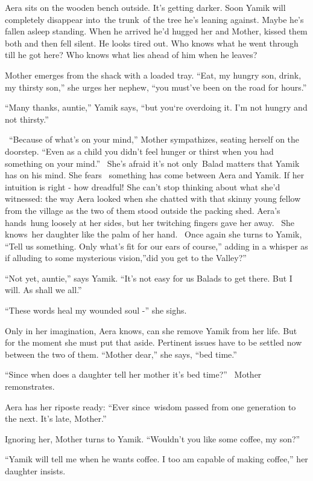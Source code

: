 \documentclass[twoside,11pt]{book}
\begin{document}
{Aera sits on the wooden bench
out}side{. }It's getting darker.
Soon{ Yamik will completely disappear into~the trunk~of the tree he's
leaning against. Maybe he's fallen asleep standing. When he }arrived he'd hugged her and Mother, kissed them both and
then fell silent. He looks tired out. Who knows what he went through till he got here? Who knows what lies ahead of him
when he leaves?

Mother emerges from the shack with a loaded tray. {{}``Eat, my hungry
son, drink, my thirsty son,'' she urges her
}{nephew}{, ``you must've been on the road for
hours.''}

{{}``Many thanks, auntie,'' Yamik says, ``but
you`re overdoing it. I'm not hungry }and not {thirsty.''}

\ {}``Because of what's on your mind,'' Mother sympathizes, seating herself on the doorstep. ``Even as a child you
didn't feel hunger or thirst when you had something on your mind.''~ She's afraid it's not only~Balad matters that
Yamik has on his mind. She fears \ something has come between Aera and Yamik. If her intuition is right - how dreadful!
She can't stop thinking about what she'd witnessed: the way Aera looked when she chatted with that
skinny{ }young fellow from the village as the two of them stood outside the packing shed. Aera's
hands~hung loosely at her sides, but her twitching fingers gave her away.~ She knows~her daughter like the palm of her
hand.~ Once again she turns to Yamik, ``Tell us something. Only what's fit for our ears of course,'' adding in a
whisper as if alluding to some mysterious vision,''did{ }you get to the Valley?''

{}``Not yet, auntie,'' says Yamik. ``It's not easy for us Balads to get there. But I will. As shall we all.''

{}``These words heal my wounded soul -'' she sighs.

Only in her imagination, Aera knows, can she remove Yamik from her life. But for the moment she must put that aside.
Pertinent issues have to be settled now between the two of them. ``Mother dear,'' she says, ``bed time.''~

{}``Since when does a daughter tell her mother it's bed time?'' \ Mother remonstrates.

Aera has her riposte ready: ``Ever since~wisdom passed from one generation to the next. It's late, Mother.''

Ignoring her, Mother turns to Yamik. ``Wouldn't you like some coffee, my son?''

{}``Yamik will tell me when he wants coffee. I too am capable of making coffee,'' her daughter insists.
\end{document}
